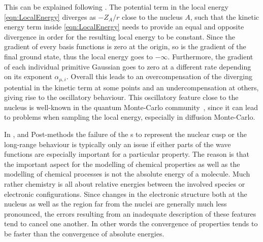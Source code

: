 This can be explained following \cite{Ma2005}.
The potential term in the local energy \eqref{eqn:LocalEnergy} diverges
as $-Z_A/r$ close to the nucleus $A$,
such that the kinetic energy term inside \eqref{eqn:LocalEnergy}
needs to provide an equal and opposite
divergence in order for the resulting local energy to be constant.
Since the gradient of every {\cGTO} basis functions is zero at the origin,
so is the gradient of the final ground state,
thus the local energy goes to $-\infty$.
Furthermore, the gradient of each individual primitive Gaussian
goes to zero at a different rate
depending on its exponent $\alpha_{\mu,i}$.
Overall this leads to an overcompensation
of the diverging potential in the kinetic term at some points
and an undercompensation at others,
giving rise to the oscillatory behaviour.
This oscillatory feature close to the nucleus is well-known
in the quantum Monte-Carlo community~\cite{Foulkes2001,Ma2005},
since it can lead to problems when sampling the local energy,
especially in diffusion Monte-Carlo.

In \HF, \DFT and Post-\HF methods
the failure of the {\cGTO}s to represent the nuclear cusp
or the long-range behaviour is typically only an issue
if either parts of the wave functions are especially important
for a particular property.
The reason is that the important aspect for the modelling of chemical
properties as well as the modelling of chemical processes
is not the absolute energy of a molecule.
Much rather chemistry is all about relative energies
between the involved species or electronic configurations.
Since changes in the electronic structure both at the nucleus as well as
the region far from the nuclei are generally much less pronounced,
the errors resulting from an inadequate description
of these features tend to cancel one another.
In other words the convergence of properties
tends to be faster than the convergence of absolute energies.

